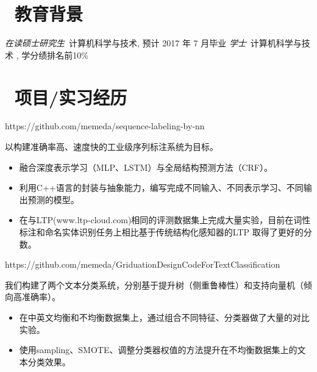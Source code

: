 \documentclass{resume}
\begin{document}



\section{\faGraduationCap\  教育背景}
\textit{在读硕士研究生}\ 计算机科学与技术, 预计 2017 年 7 月毕业
\textit{学士}\ 计算机科学与技术 , 学分绩排名前10\%

\section{\faUsers\ 项目/实习经历}

\begin{onehalfspacing}
https://github.com/memeda/sequence-labeling-by-nn

以构建准确率高、速度快的工业级序列标注系统为目标。
\begin{itemize}
  \item 融合深度表示学习（MLP、LSTM）与全局结构预测方法（CRF）。
  \item 利用C++语言的封装与抽象能力，编写完成不同输入、不同表示学习、不同输出预测的模型。
  \item 在与LTP(www.ltp-cloud.com)相同的评测数据集上完成大量实验，目前在词性标注和命名实体识别任务上相比基于传统结构化感知器的LTP 取得了更好的分数。
\end{itemize}
\end{onehalfspacing}

\begin{onehalfspacing}
https://github.com/memeda/GriduationDesignCodeForTextClassification

我们构建了两个文本分类系统，分别基于提升树（侧重鲁棒性）和支持向量机（倾向高准确率）。
\begin{itemize}
  \item 在中英文均衡和不均衡数据集上，通过组合不同特征、分类器做了大量的对比实验。
  \item 使用sampling、SMOTE、调整分类器权值的方法提升在不均衡数据集上的文本分类效果。
\end{itemize}
\end{onehalfspacing}
\end{document}
